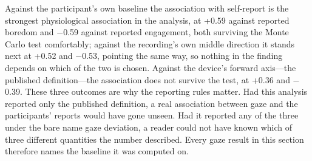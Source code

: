 Against the participant's own baseline the association with self-report is the strongest
physiological association in the analysis, at +0.59 against reported boredom and $-$0.59
against reported engagement, both surviving the Monte Carlo test comfortably; against the
recording's own middle direction it stands next at +0.52 and $-$0.53, pointing the same way,
so nothing in the finding depends on which of the two is chosen. Against the device's
forward axis---the published definition---the association does not survive the test, at
+0.36 and $-$0.39. These three outcomes are why the reporting rules matter. Had this
analysis reported only the published definition, a real association between gaze and the
participants' reports would have gone unseen. Had it reported any of the three under the
bare name gaze deviation, a reader could not have known which of three different quantities
the number described. Every gaze result in this section therefore names the baseline it was
computed on.

